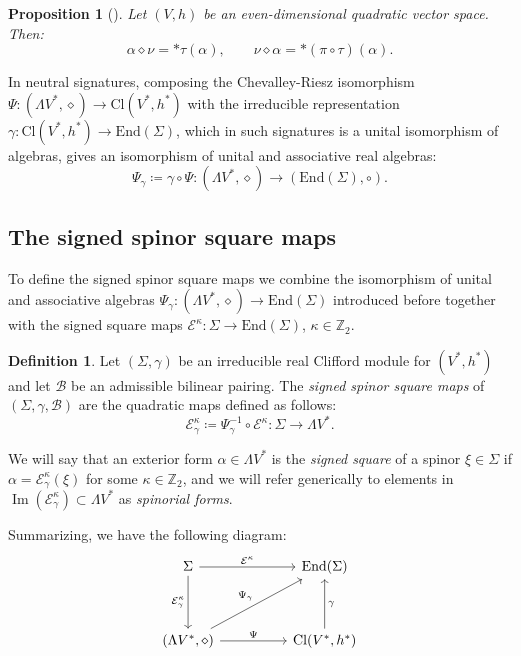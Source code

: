 \documentclass[10pt,reqno]{amsart}
\newtheorem{proposition}[theorem]{Proposition}
\theoremstyle{definition}
\newtheorem{definition}[theorem]{Definition}
\theoremstyle{remark}
\newcommand{\Z}{\mathbb{Z}}
\newcommand{\End}{\mathrm{End}}
\renewcommand{\Im}{\operatorname{Im}}
\begin{document}
\begin{proposition}[{\cite[Lemma 3.24]{Cortes_Lazaroiu_Shahbazi2021}}]\label{prop:product_volume_form}
    Let $(V,h)$ be an even-dimensional quadratic vector space. Then: $$\alpha\diamond\nu=*\tau(\alpha),\qquad \nu\diamond\alpha=*(\pi\circ\tau)(\alpha).$$
\end{proposition}

In neutral signatures, composing the Chevalley-Riesz isomorphism $\Psi\colon(\Lambda V^*,\diamond)\to\mathrm{Cl}(V^*,h^*)$ with the irreducible representation $\gamma\colon\mathrm{Cl}(V^*,h^*)\to\End(\Sigma)$, which in such signatures is a unital isomorphism of algebras, gives an isomorphism of unital and associative real algebras: $$\Psi_\gamma\coloneqq\gamma\circ\Psi\colon(\Lambda V^*,\diamond)\to(\End(\Sigma),\circ).$$

\subsection{The signed spinor square maps}

To define the signed spinor square maps we combine the isomorphism of unital and associative algebras $\Psi_\gamma\colon(\Lambda V^*,\diamond)\to\End(\Sigma)$ introduced before together with the signed square maps $\mathcal{E}^\kappa\colon\Sigma\to\End(\Sigma)$, $\kappa\in\Z_2$.

\begin{definition}
    Let $(\Sigma,\gamma)$ be an irreducible real Clifford module for $(V^*,h^*)$ and let $\mathscr{B}$ be an admissible bilinear pairing. The \emph{signed spinor square maps} of $(\Sigma,\gamma,\mathscr{B})$ are the quadratic maps defined as follows: $$\mathcal{E}^\kappa_\gamma\coloneqq\Psi_\gamma^{-1}\circ\mathcal{E}^\kappa\colon\Sigma\to\Lambda V^*.$$
    
    We will say that an exterior form $\alpha\in\Lambda V^*$ is the \emph{signed square} of a spinor $\xi\in\Sigma$ if $\alpha=\mathcal{E}^\kappa_\gamma(\xi)$ for some $\kappa\in\Z_2$, and we will refer generically to elements in $\Im(\mathcal{E}^\kappa_\gamma)\subset\Lambda V^*$ as \emph{spinorial forms}.
\end{definition}

Summarizing, we have the following diagram: $$\begin{tikzcd}
\Sigma \arrow[rr, "\mathcal{E}^\kappa"] \arrow[dd, "\mathcal{E}^\kappa_\gamma"'] &  & \End(\Sigma)                                 \\
                                                                                 &  &                                              \\
(\Lambda V^*,\diamond) \arrow[rr, "\Psi"] \arrow[rruu, "\Psi_\gamma"]                       &  & {\mathrm{Cl}(V^*,h^*)} \arrow[uu, "\gamma"']
\end{tikzcd}$$
\end{document}
